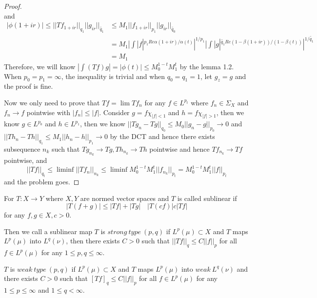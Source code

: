 \documentclass[lang=en, color=blue, ]{elegantbook}
\begin{document}
\begin{proof}
\[    \]
    and
    \[
    \begin{aligned}
        |\phi(1+ir)| \leq ||Tf_{1+ir}||_{q_1}||g_{ir}||_{\tilde{q_1}} &\leq M_1 ||f_{1+ir}||_{p_1} ||g_{ir}||_{\tilde{q_0}} \\ &= M_1 |\int |f|^{p_1Re\alpha(1+ir)/\alpha(t)}|^{1/p_1}|\int |g|^{\tilde{q_1}Re(1-\beta(1+ir))/(1-\beta(t))}|^{1/\tilde{q_1}} \\
        &= M_1
    \end{aligned}
    \]
    Therefore, we will know $|\int (Tf)g| = |\phi(t)| \leq M_0^{1-t}M_1^t$ by the lemma 1.2. When $p_0 = p_1 = \infty$, the inequality is trivial and when $q_0 = q_1 = 1$, let $g_z = g$ and the proof is fine.\par
    Now we only need to prove that $Tf = \lim Tf_n$ for any $f\in L^{p_t}$ where $f_n \in \Sigma_X$ and $f_n \to f$ pointwise with $|f_n| \leq |f|$. Consider $g = f\chi_{|f|<1}$ and $h = f\chi_{|f|>1}$, then we know $g \in L^{p_0}$ and $h\in L^{p_1}$, then we know $||Tg_n - Tg||_{q_0} \leq M_0 ||g_n - g||_{p_0} \to 0$ and $||Th_n - Th||_{q_1} \leq M_1 ||h_n - h||_{p_1} \to 0$ by the DCT and hence there exists subsequence $n_k$ such that $Tg_{n_k} \to Tg, Th_{n_k} \to Th$ pointwise and hence $Tf_{n_k} \to Tf$ pointwise, and
    \[
    ||Tf||_{q_t} \leq \liminf ||Tf_n||_{n_k} \leq \liminf M_0^{1-t}M_1^t ||f_{n_k}||_{p_t} = M_0^{1-t}M_1^t ||f||_{p_t}
    \]
    and the problem goes.
\end{proof}

\begin{definition}
    For $T:X\to Y$ where $X,Y$ are normed vector spaces and $T$ is called sublinear if
    \[|T(f+g)| \leq |Tf|+|Tg| \quad |T(cf)| c|Tf|\]
    for any $f,g\in X,c>0$.\par
    Then we call a sublinear map $T$ is $strong\ type\ (p,q)$ if $L^p(\mu) \subset X$ and $T$ maps $L^p(\mu)$ into $L^q(\nu)$, then there exists $C>0$ such that $||Tf||_q \leq C||f||_p$ for all $f\in L^p(\mu)$ for any $1\leq p,q \leq \infty$.\par
    $T$ is $weak\ type\ (p,q)$ if $L^p(\mu)\subset X$ and $T$ maps $L^p(\mu)$ into $weak\ L^q(\nu)$ and there exists $C>0$ such that $[Tf]_q \leq C||f||_p$ for all $f\in L^p(\mu)$ for any $1\leq p \leq \infty$ and $1\leq q < \infty$. 
\end{definition}
\end{document}
